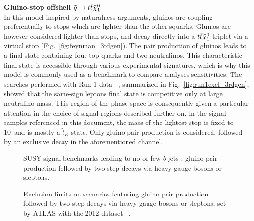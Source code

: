 \par{\bf Gluino-stop offshell $\gluino\to t\bar t\neut$\\}
In this model inspired by naturalness arguments, gluinos are coupling preferentially to stops which are lighter than the other squarks. 
Gluinos are however considered lighter than stops, and decay directly into a $t\bar t\tilde{\chi}_{1}^{0}$ triplet via a virtual stop (Fig.~\ref{fig:feynman_3rdgen}). 
The pair production of gluinos leads to a final state containing four top quarks and two neutralinos. 
This characteristic final state is accessible through various experimental signatures, which is why this model 
is commonly used as a benchmark to compare analyses sensitivities. 
The searches performed with Run-1 data~%
, 
summarized in Fig.~\ref{fig:run1excl_3rdgen}, showed that the same-sign leptons final state is competitive only at large neutralino mass. 
This region of the phase space is consequently given a particular attention in the choice of signal regions described further on. 
In the signal samples referenced in this document, the mass of the lightest stop is fixed to 10~\TeV and is mostly a $\widetilde{t}_R$ state. 
Only gluino pair production is considered, followed by an exclusive decay in the aforementioned channel. 
\\

\begin{figure}[h!]
\centering
{}\hspace{3cm}
\caption{SUSY signal benchmarks leading to no or few $b$-jets : 
gluino pair production followed by two-step decays via heavy gauge bosons or sleptons.}
\label{fig:feynman_1stgen}
\end{figure}

\begin{figure}[t]
\centering
{}
\caption{Exclusion limits on scenarios featuring gluino pair production followed by two-step decays via heavy gauge bosons or sleptons, 
set by ATLAS with the 2012 dataset~%
.}
\label{fig:run1excluded_1stgen}
\end{figure}

